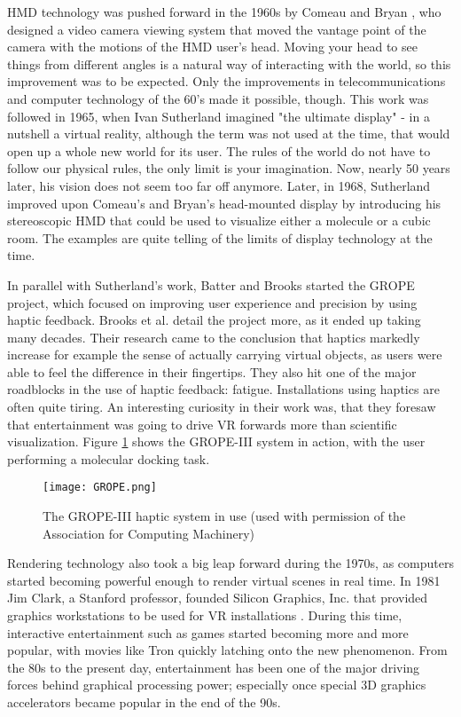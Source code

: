 \documentclass[12pt,a4paper,oneside,pdftex]{report}
\begin{document}
HMD technology was pushed forward in the 1960s by Comeau and Bryan \cite{comeau1961headsight}, who designed a video camera viewing system that moved the vantage point of the camera with the motions of the HMD user's head. Moving your head to see things from different angles is a natural way of interacting with the world, so this improvement was to be expected. Only the improvements in telecommunications and computer technology of the 60's made it possible, though. This work was followed in 1965, when Ivan Sutherland imagined "the ultimate display" \cite{sutherland1965ultimate} - in a nutshell a virtual reality, although the term was not used at the time, that would open up a whole new world for its user. The rules of the world do not have to follow our physical rules, the only limit is your imagination. Now, nearly 50 years later, his vision does not seem too far off anymore. Later, in 1968, Sutherland \cite{SutherlandHMD} improved upon Comeau's and Bryan's head-mounted display by introducing his stereoscopic HMD that could be used to visualize either a molecule or a cubic room. The examples are quite telling of the limits of display technology at the time.

In parallel with Sutherland's work, Batter and Brooks \cite{batter1971grope} started the GROPE project, which focused on improving user experience and precision by using haptic feedback. Brooks et al. \cite{brooks1990project} detail the project more, as it ended up taking many decades. Their research came to the conclusion that haptics markedly increase for example the sense of actually carrying virtual objects, as users were able to feel the difference in their fingertips. They also hit one of the major roadblocks in the use of haptic feedback: fatigue. Installations using haptics are often quite tiring. An interesting curiosity in their work was, that they foresaw that entertainment was going to drive VR forwards more than scientific visualization. Figure \ref{figure:GROPE} shows the GROPE-III system in action, with the user performing a molecular docking task.

\begin{figure}[h]
    \centering
    \texttt{[image: GROPE.png]}
    \caption{The GROPE-III haptic system in use (used with permission of the Association for Computing Machinery) \cite{brooks1990project}}
    \label{figure:GROPE}
\end{figure}

Rendering technology also took a big leap forward during the 1970s, as computers started becoming powerful enough to render virtual scenes in real time. In 1981 Jim Clark, a Stanford professor, founded Silicon Graphics, Inc. that provided graphics workstations to be used for VR installations \cite{Sherman:2002:UVR:581839}. During this time, interactive entertainment such as games started becoming more and more popular, with movies like Tron quickly latching onto the new phenomenon. From the 80s to the present day, entertainment has been one of the major driving forces behind graphical processing power; especially once special 3D graphics accelerators became popular in the end of the 90s. 
\end{document}
